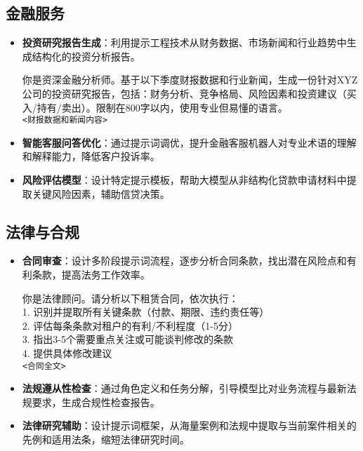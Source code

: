 \documentclass[12pt]{ctexart}
\begin{document}
\subsection{金融服务}

\begin{itemize}
  \item \textbf{投资研究报告生成}：利用提示工程技术从财务数据、市场新闻和行业趋势中生成结构化的投资分析报告。
  
  \begin{promptbox}
  你是资深金融分析师。基于以下季度财报数据和行业新闻，生成一份针对XYZ公司的投资研究报告，包括：财务分析、竞争格局、风险因素和投资建议（买入/持有/卖出）。限制在800字以内，使用专业但易懂的语言。\\
  \texttt{<财报数据和新闻内容>}
  \end{promptbox}
  
  \item \textbf{智能客服问答优化}：通过提示词调优，提升金融客服机器人对专业术语的理解和解释能力，降低客户投诉率。
  
  \item \textbf{风险评估模型}：设计特定提示模板，帮助大模型从非结构化贷款申请材料中提取关键风险因素，辅助信贷决策。
\end{itemize}

\subsection{法律与合规}

\begin{itemize}
  \item \textbf{合同审查}：设计多阶段提示词流程，逐步分析合同条款，找出潜在风险点和有利条款，提高法务工作效率。
  
  \begin{promptbox}
  你是法律顾问。请分析以下租赁合同，依次执行：\\
  1. 识别并提取所有关键条款（付款、期限、违约责任等）\\
  2. 评估每条条款对租户的有利/不利程度（1-5分）\\
  3. 指出3-5个需要重点关注或可能谈判修改的条款\\
  4. 提供具体修改建议\\
  \texttt{<合同全文>}
  \end{promptbox}
  
  \item \textbf{法规遵从性检查}：通过角色定义和任务分解，引导模型比对业务流程与最新法规要求，生成合规性检查报告。
  
  \item \textbf{法律研究辅助}：设计提示词框架，从海量案例和法规中提取与当前案件相关的先例和适用法条，缩短法律研究时间。
\end{itemize}
\end{document}
